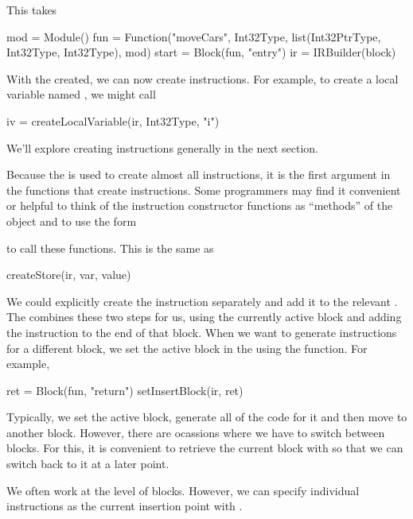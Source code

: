 \documentclass[article]{jss}
\begin{document}
This takes 
\begin{RCode}
mod = Module()
fun = Function("moveCars", Int32Type, list(Int32PtrType, Int32Type, Int32Type), mod)
start = Block(fun, "entry")
ir = IRBuilder(block)  
\end{RCode}

With the  created, we can now create instructions.
For example, to create a local variable named , we might
call
\begin{RCode}
iv = createLocalVariable(ir, Int32Type, "i")  
\end{RCode}
We'll explore creating instructions generally in the next
section. 

Because the  is used to create almost all
instructions, it is the first argument in the functions
that create instructions.
Some programmers may find it convenient or helpful to 
think of the instruction constructor functions
as ``methods'' of the  object and
to use the form
to call these functions.
This is the same as
\begin{RCode}
createStore(ir, var, value)
\end{RCode}

We could explicitly create the instruction separately and add it to
the relevant .  The  combines these
two steps for us, using the currently active block and adding the
instruction to the end of that block.  When we want to generate
instructions for a different block, we set the active block in the
 using the  function.
For example, 
\begin{RCode}
ret = Block(fun, "return")
setInsertBlock(ir, ret)
\end{RCode}

Typically, we set the active block, generate all of the code for it
and then move to another block.  However, there are ocassions where we
have to switch between blocks. For this, it is convenient to retrieve
the current block with  so that we can switch
back to it at a later point.

We often work at the level of blocks. However, we can specify
individual instructions as the current insertion point
with .%

\end{document}
